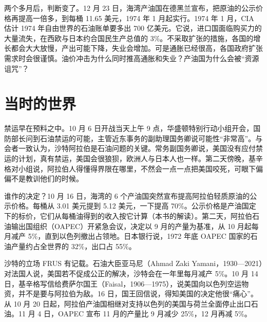 两个多月后，判断变了。12 月 23 日，海湾产油国在德黑兰宣布，把原油的公示价格再提高一倍多，到每桶 11.65 美元，1974 年 1 月起实行\cite{boj1986,frus47}。1974 年 1 月，CIA 估计 1974 年自由世界的石油账单要多出 700 亿美元\cite{frus47}。它说，进口国面临购买力的大量流失，在西欧与日本约合国民生产总值的 3\%\cite{frus47}。不采取扩张的措施，各国的增长都会大大放慢，产出可能下降，失业会增加。可是通胀已经很高，各国政府扩张需求时会很谨慎\cite{frus47}。油价冲击为什么同时推高通胀和失业？产油国为什么会被“资源诅咒”？

\section{当时的世界}\label{sec:oil-world}

禁运早在预料之中。10 月 6 日开战当天上午 9 点，华盛顿特别行动小组开会，国防部长问到石油禁运的可能，主管近东事务的副助理国务卿说可能性“非常高”\cite{frus47}。与会者一致认为，沙特阿拉伯是石油问题的关键\cite{frus47}。常务副国务卿说，美国没有应付禁运的计划，真有禁运，美国会很狼狈，欧洲人与日本人也一样\cite{frus47}。第二天傍晚，基辛格对小组说，阿拉伯人得懂得界限在哪里，不然会一点一点把美国咬死，可眼下偏偏不是教训他们的时候\cite{frus47}。

谁作的决定？10 月 16 日，海湾的 6 个产油国突然宣布提高阿拉伯轻质原油的公示价格\cite{boj1986}。每桶从 3.01 美元提到 5.12 美元，一下提高 70\%\cite{boj1986}。公示价格是产油国定下的标价，它们从每桶油得到的收入按它计算（本书的解读）。第二天，阿拉伯石油输出国组织（OAPEC）开紧急会议，决定以 9 月的产量为基准，从 10 月起每月减产 5\%，直到以色列撤出占领地\cite{boj1986}。日本银行说，1972 年底 OAPEC 国家的石油产量约占全世界的 32\%，出口占 55\%\cite{boj1986}。

沙特的立场 FRUS 有记载。石油大臣亚马尼（Ahmad Zaki Yamani，1930—2021）对法国人说，美国若不促成公正的解决，沙特会在一年里每月减产 5\%\cite{frus47,loc47}。10 月 14 日，基辛格写信给费萨尔国王（Faisal，1906—1975），说美国向以色列空运物资，并不是要与阿拉伯为敌\cite{frus47,loc47}。16 日，国王回信说，得知美国的决定他很“痛心”\cite{frus47}。从 10 月 20 日起，阿拉伯产油国相继对支持以色列的美国与荷兰全面停止出口石油\cite{boj1986}。11 月 4 日，OAPEC 宣布 11 月的产量比 9 月减少 25\%，12 月再减 5\%\cite{boj1986}。

